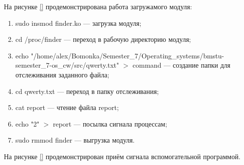 На рисунке \ref{} продемонстрирована работа загружамого модуля:
\begin{enumerate}[label=\arabic*.]
	\item sudo insmod finder.ko --- загрузка модуля;
	\item cd /proc/finder --- переход в рабочую директорию модуля;
	\item echo "/home/alex/Bomonka/Semester\_7/Operating\_systems/bmstu-semester\_7-os\_cw/src/qwerty.txt" $>$ command --- создание папки для отслеживания заданного файла;
	\item cd qwerty.txt --- переход в папку отслеживания;
	\item cat report --- чтение файла report;
	\item echo "2" $>$ report --- посылка сигнала процессам;
	\item sudo rmmod finder --- выгрузка модуля.
\end{enumerate}

На рисунке \ref{} продемонстрирован приём сигнала вспомогательной программой.
